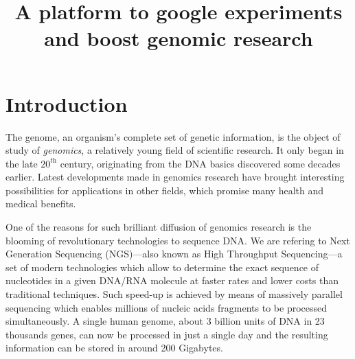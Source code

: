 \documentclass[journal]{IEEEtran}
\begin{document}
\title{A platform to google experiments \\and boost genomic research}

\author{
}

\maketitle

\begin{abstract}


\end{abstract}



\IEEEpeerreviewmaketitle



\section{Introduction}
\label{sec:intro}
The genome, an organism's complete set of genetic information, is the object of study of \textit{genomics}, a relatively young field of scientific research. It only began in the late $\textit{20}^{\textit{th}}$ century, originating from the DNA basics discovered some decades earlier.  Latest developments made in genomics research have brought interesting possibilities for applications in other fields, which promise many health and medical benefits.

One of the reasons for such brilliant diffusion of genomics research is the blooming of revolutionary technologies to sequence DNA. We are refering to Next Generation Sequencing (NGS)---also known as High Throughput Sequencing---a set of modern technologies which allow to determine the exact sequence of nucleotides in a given DNA/RNA molecule at faster rates and lower costs than traditional techniques. Such speed-up is achieved by means of massively parallel sequencing which enables millions of nucleic acids fragments to be processed simultaneously.
A single human genome, about 3 billion units of DNA in 23 thousands genes,  can now be processed in just a single day and the resulting information can be stored in around 200 Gigabytes.
\end{document}
